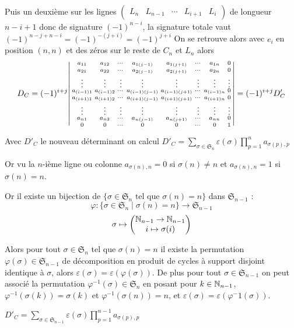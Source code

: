 \begin{prop}
Puis un deuxième sur les lignes $\begin{pmatrix}
L_n & L_{n-1} & \cdots & L_{i+1} & L_i
\end{pmatrix}$ de longueur $n-i+1$ donc de signature $(-1)^{n-i}$, la signature totale vaut $(-1)^{n-j+n-i}=(-1)^{-(j+i)}=(-1)^{j+i}$
On se retrouve alors avec $e_i$ en position $(n,n)$ et des zéros sur le reste de $C_n$ et $L_n$ alors 
{$$D_C=(-1)^{i+j}\begin{vsmallmatrix}
    a_{11} & a_{12} & \cdots &a_{1(j-1)}&a_{1(j+1)}& \cdots & a_{1n} & 0 \\
a_{21} & a_{22} & \cdots & a_{2(j-1)} &a_{2(j+1)}& \cdots & a_{2n}&0 \\
\vdots & \vdots & \vdots & \vdots & \vdots & \vdots & \vdots & \vdots  \\
a_{(i-1)1} & a_{(i-1)2} & \cdots & a_{(i-1)(j-1)} &a_{(i-1)(j+1)}& \cdots & a_{(i-1)n} & 0 \\
a_{(i+1)1} & a_{(i+1)2} & \cdots & a_{(i+1)(j-1)} &a_{(i+1)(j+1)}& \cdots & a_{(i+1)n} & 0\\
\vdots & \vdots & \vdots & \vdots & \vdots & \vdots & \vdots & \vdots  \\
a_{n1} & a_{n2} & \cdots &a_{n(j-1)} &a_{n(j+1)}& \cdots & a_{nn} & 0 \\
0&0&\cdots&0&0&\cdots&0&1
\end{vsmallmatrix}=(-1)^{i+j}D'_C$$}

Avec $D'_C$ le nouveau déterminant on calcul $\displaystyle D'_C=\sum_{\sigma\in\mathfrak{S}_n}\varepsilon(\sigma)\prod_{p=1}^n a_{\sigma(p),p}$

Or vu la $n$-ième ligne ou colonne $a_{\sigma(n),n}=0$ si $\sigma(n)\neq n$ et $a_{\sigma(n),n}=1$ si $\sigma(n)= n$.
\end{prop}

\begin{suite}
Or il existe un bijection de $\{\sigma\in\mathfrak{S}_n \text { tel que } \sigma(n)=n\}$ dans $\mathfrak{S}_{n-1}$ : $$ \varphi : \{\sigma\in\mathfrak{S}_n \mid \sigma(n)=n\}\to \mathfrak{S}_{n-1}$$
$$\sigma\mapsto \begin{pmatrix}
\mathbb{N}_{n-1}\to\mathbb{N}_{n-1}\\
i\mapsto \sigma(i)
\end{pmatrix}$$

Alors pour tout $\sigma\in \mathfrak{S}_n$ tel que $\sigma(n)=n$ il existe la permutation $\varphi(\sigma)\in\mathfrak{S}_{n-1}$ de décomposition en produit de cycles à support disjoint identique à $\sigma$, alors $\varepsilon(\sigma)=\varepsilon(\varphi(\sigma))$. De plus pour tout $\sigma\in\mathfrak{S}_{n-1}$ on peut associé la permutation $\varphi^{-1}(\sigma)\in\mathfrak{S}_n$ en posant pour $k\in\mathbb{N}_{n-1}$, $\varphi^{-1}(\sigma(k))=\sigma(k)$ et $\varphi^{-1}(\sigma(n))=n$, et $\varepsilon(\sigma)=\varepsilon(\varphi^-1(\sigma))$.

$\displaystyle D'_C=\sum_{\sigma\in\mathfrak{S}_{n-1}}\varepsilon(\sigma)\prod_{p=1}^{n-1} a_{\sigma(p),p}$
\end{suite}

